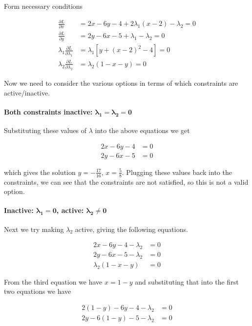\documentclass[11pt,letterpaper,onecolumn,notitlepage]{article}
\begin{document}
  Form necessary conditions

  \begin{align*}
    \frac{\partial L}{\partial x}&=2x-6y-4+2\lambda_{1}(x-2)-\lambda_{2}=0 \\
    \frac{\partial L}{\partial y}&=2y-6x-5+\lambda_{1}-\lambda_{2}=0 \\
    \lambda_{1}\frac{\partial L}{\partial\lambda_{1}}&=\lambda_{1}\left[y+(x-2)^{2}-4\right]=0 \\
    \lambda_{2}\frac{\partial L}{\partial\lambda_{2}}&=\lambda_{2}(1-x-y)=0
  \end{align*}

  Now we need to consider the various options in terms of which constraints are active/inactive.

  \paragraph{Both constraints inactive: $\boldsymbol{\lambda_{1}=\lambda_{2}=0}$}

  Substituting these values of $\lambda$ into the above equations we get

  \begin{align*}
    2x-6y-4 &= 0 \\
    2y-6x-5 &= 0
  \end{align*}

  which gives the solution $y=-\frac{17}{16}$, $x=\frac{5}{8}$.
  Plugging these values back into the constraints, we can see that the constraints are not satisfied, so this is not a valid option.

  \paragraph{Inactive: $\boldsymbol{\lambda_{1}=0}$, active: $\boldsymbol{\lambda_{2}\neq0}$}

  Next we try making $\lambda_{2}$ active, giving the following equations.

  \begin{align*}
    2x-6y-4-\lambda_{2} &= 0 \\
    2y-6x-5-\lambda_{2} &= 0 \\
    \lambda_{2}(1-x-y)  &= 0
  \end{align*}

  From the third equation we have $x=1-y$ and substituting that into the first two equations we have

  \begin{align*}
    2(1-y)-6y-4-\lambda_{2} &= 0 \\
    2y-6(1-y)-5-\lambda_{2} &= 0 \\
  \end{align*}
\end{document}
